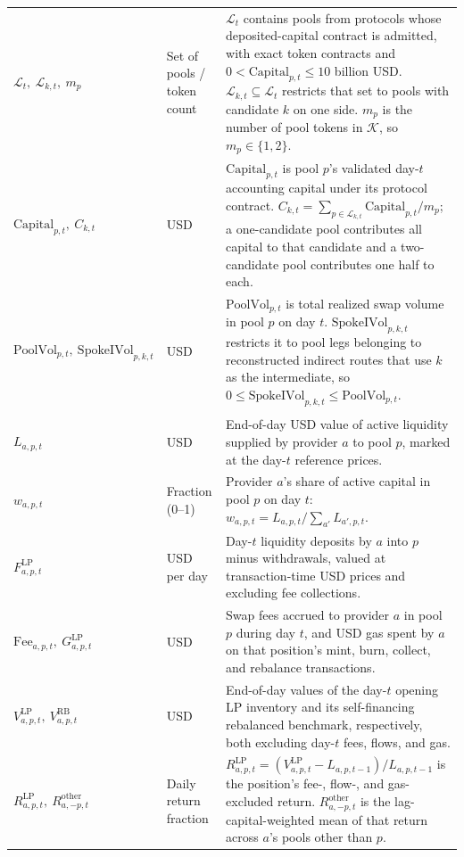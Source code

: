 \begin{tabularx}{\linewidth}{@{}>{\raggedright\arraybackslash}Xl>{\raggedright\arraybackslash}X@{}}
$\mathcal L_t,\ \mathcal L_{k,t},\ m_p$ & Set of pools / token count & $\mathcal L_t$ contains pools from protocols whose deposited-capital contract is admitted, with exact token contracts and $0<\mathrm{Capital}_{p,t}\le 10$ billion USD. $\mathcal L_{k,t}\subseteq\mathcal L_t$ restricts that set to pools with candidate $k$ on one side. $m_p$ is the number of pool tokens in $\mathcal K$, so $m_p\in\{1,2\}$. \\
$\mathrm{Capital}_{p,t},\ C_{k,t}$ & USD & $\mathrm{Capital}_{p,t}$ is pool $p$'s validated day-$t$ accounting capital under its protocol contract. $C_{k,t}=\sum_{p\in\mathcal L_{k,t}}\mathrm{Capital}_{p,t}/m_p$; a one-candidate pool contributes all capital to that candidate and a two-candidate pool contributes one half to each. \\
$\mathrm{PoolVol}_{p,t},\ \mathrm{SpokeIVol}_{p,k,t}$ & USD & $\mathrm{PoolVol}_{p,t}$ is total realized swap volume in pool $p$ on day $t$. $\mathrm{SpokeIVol}_{p,k,t}$ restricts it to pool legs belonging to reconstructed indirect routes that use $k$ as the intermediate, so $0\le\mathrm{SpokeIVol}_{p,k,t}\le\mathrm{PoolVol}_{p,t}$. \\
\addlinespace
\multicolumn{3}{@{}l}{\textit{LP portfolio objects}} \\
$L_{a,p,t}$ & USD & End-of-day USD value of active liquidity supplied by provider $a$ to pool $p$, marked at the day-$t$ reference prices. \\
$w_{a,p,t}$ & Fraction (0--1) & Provider $a$'s share of active capital in pool $p$ on day $t$: $w_{a,p,t}=L_{a,p,t}/\sum_{a'}L_{a',p,t}$. \\
$F^{\mathrm{LP}}_{a,p,t}$ & USD per day & Day-$t$ liquidity deposits by $a$ into $p$ minus withdrawals, valued at transaction-time USD prices and excluding fee collections. \\
$\mathrm{Fee}_{a,p,t},\ G^{\mathrm{LP}}_{a,p,t}$ & USD & Swap fees accrued to provider $a$ in pool $p$ during day $t$, and USD gas spent by $a$ on that position's mint, burn, collect, and rebalance transactions. \\
$V^{\mathrm{LP}}_{a,p,t},\ V^{\mathrm{RB}}_{a,p,t}$ & USD & End-of-day values of the day-$t$ opening LP inventory and its self-financing rebalanced benchmark, respectively, both excluding day-$t$ fees, flows, and gas. \\
$R^{\mathrm{LP}}_{a,p,t},\ R^{\mathrm{other}}_{a,-p,t}$ & Daily return fraction & $R^{\mathrm{LP}}_{a,p,t}=(V^{\mathrm{LP}}_{a,p,t}-L_{a,p,t-1})/L_{a,p,t-1}$ is the position's fee-, flow-, and gas-excluded return. $R^{\mathrm{other}}_{a,-p,t}$ is the lag-capital-weighted mean of that return across $a$'s pools other than $p$. \\

\end{tabularx}
